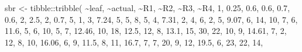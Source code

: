 \documentclass[
  letterpaper,
]{book}
\newenvironment{Shaded}{\begin{snugshade}}{\end{snugshade}}
\newcommand{\DecValTok}[1]{\textcolor[rgb]{0.68,0.00,0.00}{#1}}
\newcommand{\FloatTok}[1]{\textcolor[rgb]{0.68,0.00,0.00}{#1}}
\newcommand{\FunctionTok}[1]{\textcolor[rgb]{0.28,0.35,0.67}{#1}}
\newcommand{\NormalTok}[1]{\textcolor[rgb]{0.00,0.23,0.31}{#1}}
\newcommand{\OtherTok}[1]{\textcolor[rgb]{0.00,0.23,0.31}{#1}}
\newcommand{\SpecialCharTok}[1]{\textcolor[rgb]{0.37,0.37,0.37}{#1}}
\begin{document}
\begin{Shaded}
\begin{Highlighting}[]
\NormalTok{sbr }\OtherTok{\textless{}{-}}\NormalTok{ tibble}\SpecialCharTok{::}\FunctionTok{tribble}\NormalTok{(}
\SpecialCharTok{\textasciitilde{}}\NormalTok{leaf, }\SpecialCharTok{\textasciitilde{}}\NormalTok{actual, }\SpecialCharTok{\textasciitilde{}}\NormalTok{R1, }\SpecialCharTok{\textasciitilde{}}\NormalTok{R2,  }\SpecialCharTok{\textasciitilde{}}\NormalTok{R3, }\SpecialCharTok{\textasciitilde{}}\NormalTok{R4,}
\DecValTok{1}\NormalTok{,    }\FloatTok{0.25}\NormalTok{, }\FloatTok{0.6}\NormalTok{, }\FloatTok{0.6}\NormalTok{,  }\FloatTok{0.7}\NormalTok{, }\FloatTok{0.6}\NormalTok{,}
\DecValTok{2}\NormalTok{,     }\FloatTok{2.5}\NormalTok{,   }\DecValTok{2}\NormalTok{, }\FloatTok{0.7}\NormalTok{,    }\DecValTok{5}\NormalTok{,   }\DecValTok{1}\NormalTok{,}
\DecValTok{3}\NormalTok{,    }\FloatTok{7.24}\NormalTok{,   }\DecValTok{5}\NormalTok{,   }\DecValTok{5}\NormalTok{,    }\DecValTok{8}\NormalTok{,   }\DecValTok{5}\NormalTok{,}
\DecValTok{4}\NormalTok{,    }\FloatTok{7.31}\NormalTok{,   }\DecValTok{2}\NormalTok{,   }\DecValTok{4}\NormalTok{,    }\DecValTok{6}\NormalTok{,   }\DecValTok{2}\NormalTok{,}
\DecValTok{5}\NormalTok{,    }\FloatTok{9.07}\NormalTok{,   }\DecValTok{6}\NormalTok{,  }\DecValTok{14}\NormalTok{,   }\DecValTok{10}\NormalTok{,   }\DecValTok{7}\NormalTok{,}
\DecValTok{6}\NormalTok{,    }\FloatTok{11.6}\NormalTok{,   }\DecValTok{5}\NormalTok{,   }\DecValTok{6}\NormalTok{,   }\DecValTok{10}\NormalTok{,   }\DecValTok{5}\NormalTok{,}
\DecValTok{7}\NormalTok{,   }\FloatTok{12.46}\NormalTok{,  }\DecValTok{10}\NormalTok{,  }\DecValTok{18}\NormalTok{, }\FloatTok{12.5}\NormalTok{,  }\DecValTok{12}\NormalTok{,}
\DecValTok{8}\NormalTok{,    }\FloatTok{13.1}\NormalTok{,  }\DecValTok{15}\NormalTok{,  }\DecValTok{30}\NormalTok{,   }\DecValTok{22}\NormalTok{,  }\DecValTok{10}\NormalTok{,}
\DecValTok{9}\NormalTok{,   }\FloatTok{14.61}\NormalTok{,   }\DecValTok{7}\NormalTok{,   }\DecValTok{2}\NormalTok{,   }\DecValTok{12}\NormalTok{,   }\DecValTok{8}\NormalTok{,}
\DecValTok{10}\NormalTok{,  }\FloatTok{16.06}\NormalTok{,   }\DecValTok{6}\NormalTok{,   }\DecValTok{9}\NormalTok{, }\FloatTok{11.5}\NormalTok{,   }\DecValTok{8}\NormalTok{,}
\DecValTok{11}\NormalTok{,   }\FloatTok{16.7}\NormalTok{,   }\DecValTok{7}\NormalTok{,   }\DecValTok{7}\NormalTok{,   }\DecValTok{20}\NormalTok{,   }\DecValTok{9}\NormalTok{,}
\DecValTok{12}\NormalTok{,   }\FloatTok{19.5}\NormalTok{,   }\DecValTok{6}\NormalTok{,  }\DecValTok{23}\NormalTok{,   }\DecValTok{22}\NormalTok{,  }\DecValTok{14}\NormalTok{,}

\end{Highlighting}
\end{Shaded}
\end{document}
